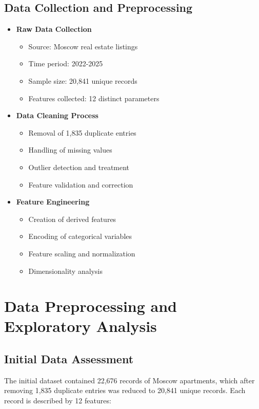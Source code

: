 \documentclass[12pt,a4paper]{report}
\begin{document}
\subsection{Data Collection and Preprocessing}
\begin{itemize}
    \item \textbf{Raw Data Collection}
    \begin{itemize}
        \item Source: Moscow real estate listings
        \item Time period: 2022-2025
        \item Sample size: 20,841 unique records
        \item Features collected: 12 distinct parameters
    \end{itemize}
    
    \item \textbf{Data Cleaning Process}
    \begin{itemize}
        \item Removal of 1,835 duplicate entries
        \item Handling of missing values
        \item Outlier detection and treatment
        \item Feature validation and correction
    \end{itemize}
    
    \item \textbf{Feature Engineering}
    \begin{itemize}
        \item Creation of derived features
        \item Encoding of categorical variables
        \item Feature scaling and normalization
        \item Dimensionality analysis
    \end{itemize}
\end{itemize}

\section{Data Preprocessing and Exploratory Analysis}
\subsection{Initial Data Assessment}
The initial dataset contained 22,676 records of Moscow apartments, which after removing 1,835 duplicate entries was reduced to 20,841 unique records. Each record is described by 12 features:
\end{document}
